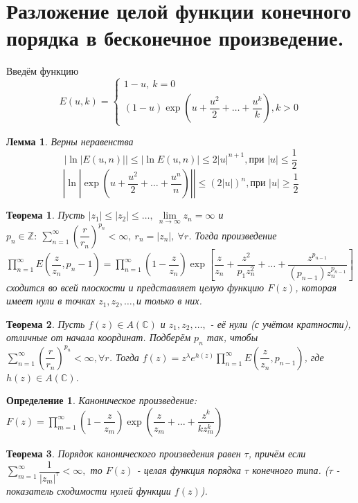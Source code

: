 \documentclass[9pt]{article}
\newtheorem{theorem}{Теорема} %
\newtheorem{lemma}{Лемма} %
\newtheorem{definition}{Определение}
\begin{document}
	\section{ Разложение целой функции конечного порядка в бесконечное произведение.}
		Введём функцию
		$$
			E(u,k) = \begin{cases}
				1-u, \ k = 0 \\
				(1-u) \exp{\left(u+ \dfrac{u^2}{2} + \dots + \dfrac{u^k}{k}\right)}, k > 0
			\end{cases}
		$$
		\begin{lemma}
			Верны неравенства
			$$
			|\ln{|E(u,n)|}| \leq | \ln{E(u,n)} | \leq 2 |u|^{n+1}, \text{при } |u| \leq \dfrac12
			$$
			$$
			|\ln{|\exp{\left(u+ \dfrac{u^2}{2} + \dots + \dfrac{u^n}{n}\right)}|}| \leq \left(2|u|\right)^n, \text{при } |u| \geq \dfrac12
			$$
		\end{lemma}
		\begin{theorem}
			Пусть $|z_1| \leq |z_2| \leq \dots, \ \lim\limits_{n\to\infty} z_n = \infty$ и $p_n \in \mathbb{Z}: \ \sum\limits_{n=1}^{\infty} \left(\dfrac{r}{r_n}\right)^{p_n} < \infty, \ r_n = |z_n|, \ \forall r$. Тогда произведение $\prod\limits_{n=1}^{\infty} E(\dfrac{z}{z_n}, p_n -1) = \prod\limits_{n=1}^{\infty} \left(1 - \dfrac{z}{z_n}\right) \exp{\left[\dfrac{z}{z_n} + \dfrac{z^2}{p_1 z_n^2} + \dots + \dfrac{z^{p_{n-1}}}{(p_{n-1}) z_n^{p_{n-1}}}\right]}$ сходится во всей плоскости и представляет целую функцию $F(z)$, которая имеет нули в точках $z_1, z_2, \dots, $и только в них.
		\end{theorem}
		\begin{theorem}
			Пусть $f(z) \in A(\mathbb{C})$ и $z_1, z_2, \dots,$ - её нули (с учётом кратности), отличные от начала координат. Подберём $p_n$ так, чтобы $\sum\limits_{n=1}^{\infty} \left(\dfrac{r}{r_n}\right)^{p_n} < \infty, \forall r$. Тогда $f(z) = z^\lambda e^{h(z)} \prod\limits_{n=1}^{\infty} E(\dfrac{z}{z_n}, p_{n-1})$, где $h(z) \in A(\mathbb{C})$.	
		\end{theorem}
		\begin{definition}
			Каноническое произведение: $F(z) = \prod\limits_{m=1}^{\infty} \left(1 - \dfrac{z}{z_m}\right) \exp{\left(\dfrac{z}{z_m} + \dots + \dfrac{z^k}{kz_m^k}\right)}$	
		\end{definition}
		\begin{theorem}
			Порядок канонического произведения равен $\tau$, причём если $\sum\limits_{m=1}^{\infty} \dfrac{1}{|z_m|^\tau} < \infty,$ то $F(z)$ - целая функция порядка $\tau$ конечного типа. ($\tau$ - показатель сходимости нулей функции $f(z)$).
		\end{theorem}
\end{document}
